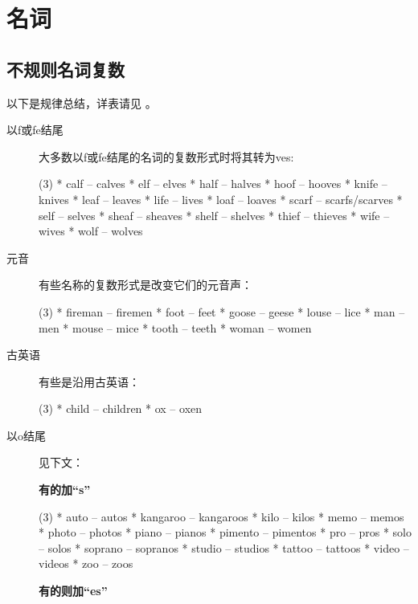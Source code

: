 \section{名词}

\subsection{不规则名词复数}

以下是规律总结，详表请见 。

\begin{description}
\item[以f或fe结尾] 大多数以f或fe结尾的名词的复数形式时将其转为ves:
  \begin{taskitem}(3)
    *  calf -- calves
    *  elf -- elves
    *  half -- halves
    *  hoof -- hooves
    *  knife -- knives
    *  leaf -- leaves
    *  life -- lives
    *  loaf -- loaves
    *  scarf -- scarfs/scarves
    *  self -- selves
    *  sheaf -- sheaves
    *  shelf -- shelves
    *  thief -- thieves
    *  wife -- wives
    *  wolf -- wolves
  \end{taskitem}

\item[元音] 有些名称的复数形式是改变它们的元音声：
  \begin{taskitem}(3)
    *  fireman -- firemen
    *  foot -- feet
    *  goose -- geese
    *  louse -- lice
    *  man -- men
    *  mouse -- mice
    *  tooth -- teeth
    *  woman -- women
  \end{taskitem}


\item[古英语] 有些是沿用古英语：
  \begin{taskitem}(3)
    *  child -- children
    *  ox -- oxen
  \end{taskitem}


\item[以o结尾] 见下文：

  \textbf{有的加``s''}

  \begin{taskitem}(3)
    *  auto -- autos
    *  kangaroo -- kangaroos
    *  kilo -- kilos
    *  memo -- memos
    *  photo -- photos
    *  piano -- pianos
    *  pimento -- pimentos
    *  pro -- pros
    *  solo -- solos
    *  soprano -- sopranos
    *  studio -- studios
    *  tattoo -- tattoos
    *  video -- videos
    *  zoo -- zoos
  \end{taskitem}

  \textbf{有的则加``es''}


\end{description}
